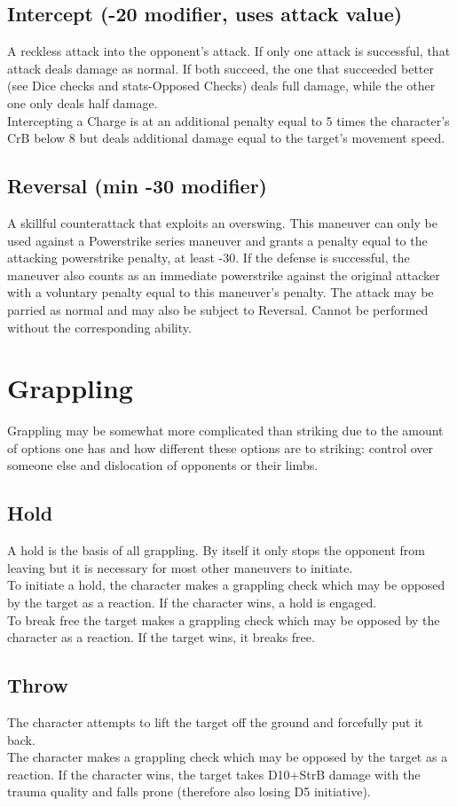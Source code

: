 \documentclass[12pt,a4paper,openany]{book}
\begin{document}
	\subsection*{Intercept (-20 modifier, uses attack value)}
	A reckless attack into the opponent's attack. If only one attack is successful, that attack deals damage as normal. If both succeed, the one that succeeded better (see Dice checks and stats-Opposed Checks) deals full damage, while the other one only deals half damage.\\
	Intercepting a Charge is at an additional penalty equal to 5 times the character’s CrB below 8 but deals additional damage equal to the target’s movement speed.
	\subsection*{Reversal (min -30 modifier)}
	A skillful counterattack that exploits an overswing. This maneuver can only be used against a Powerstrike series maneuver and grants a penalty equal to the attacking powerstrike penalty, at least -30. If the defense is successful, the maneuver also counts as an immediate powerstrike against the original attacker with a voluntary penalty equal to this maneuver’s penalty. The attack may be parried as normal and may also be subject to Reversal. Cannot be performed without the corresponding ability.
	\section{Grappling}
	Grappling may be somewhat more complicated than striking due to the amount of options one has and how different these options are to striking: control over someone else and dislocation of opponents or their limbs.
	\subsection*{Hold}
	A hold is the basis of all grappling. By itself it only stops the opponent from leaving but it is necessary for most other maneuvers to initiate.\\
	To initiate a hold, the character makes a grappling check which may be opposed by the target as a reaction. If the character wins, a hold is engaged.\\
	To break free the target makes a grappling check which may be opposed by the character as a reaction. If the target wins, it breaks free.
	\subsection*{Throw}
	The character attempts to lift the target off the ground and forcefully put it back.\\
	The character makes a grappling check which may be opposed by the target as a reaction. If the character wins, the target takes D10+StrB damage with the trauma quality and falls prone (therefore also losing D5 initiative).
\end{document}
